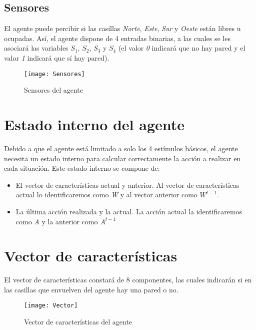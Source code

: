 \FloatBarrier
\subsection{Sensores}
El agente puede percibir si las casillas \emph{Norte}, \emph{Este}, \emph{Sur} y \emph{Oeste} están libres u ocupadas. Así, el agente dispone de 4 entradas binarias, a las cuales se les asociará las variables \emph{$S_{1}$}, \emph{$S_{2}$}, \emph{$S_{3}$} y \emph{$S_{4}$} (el valor \emph{0} indicará que no hay pared y el valor \emph{1} indicará que sí hay pared).

\begin{figure}[!ht]
    \centering
    \texttt{[image: Sensores]}
    \caption{Sensores del agente}
    \label{fig:sensores}
\end{figure}

\section{Estado interno del agente}

Debido a que el agente está limitado a solo los 4 estímulos básicos, el agente necesita un estado interno para calcular correctamente la acción a realizar en cada situación. Este estado interno se compone de:

\begin{itemize}
    \item El vector de características actual y anterior. Al vector de características actual lo identificaremos como \emph{W} y al vector anterior como \emph{$W^{t-1}$}.
    \item La última acción realizada y la actual. La acción actual la identificaremos como \emph{A} y la anterior como \emph{$A^{t-1}$}
\end{itemize}

\section{Vector de características}

El vector de características constará de 8 componentes, las cuales indicarán si en las casillas que envuelven del agente hay una pared o no.

\begin{figure}[!ht]
    \centering
    \texttt{[image: Vector]}
    \caption{Vector de características del agente}
    \label{fig:caracteristicas}
\end{figure}

